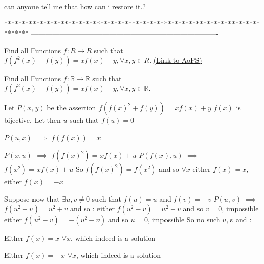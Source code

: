 \begin{solution}
	can anyone tell me that how can i restore it.?
\end{solution}
*******************************************************************************
-------------------------------------------------------------------------------

\begin{problem}
	Find all Functions $f:R \to R$ such that $f\left( {{f^2}\left( x \right) + f\left( y \right)} \right) = xf\left( x \right) + y,\forall x,y \in R.$
	\flushright \href{https://artofproblemsolving.com/community/c6h565030}{(Link to AoPS)}
\end{problem}



\begin{solution}
	\begin{tcolorbox}Find all Functions $f:\mathbb R \to \mathbb R$ such that $f\left( {{f^2}\left( x \right) + f\left( y \right)} \right) = xf\left( x \right) + y,\forall x,y \in \mathbb R.$\end{tcolorbox}
Let $P(x,y)$ be the assertion $f(f(x)^2+f(y))=xf(x)+y$
$f(x)$ is bijective.
Let then $u$ such that $f(u)=0$

$P(u,x)$ $\implies$ $f(f(x))=x$

$P(x,u)$ $\implies$ $f(f(x)^2)=xf(x)+u$
$P(f(x),u)$ $\implies$ $f(x^2)=xf(x)+u$
So $f(f(x)^2)=f(x^2)$ and so $\forall x$ either $f(x)=x$, either $f(x)=-x$

Suppose now that $\exists u,v\ne 0$ such that $f(u)=u$ and $f(v)=-v$
$P(u,v)$ $\implies$ $f(u^2-v)=u^2+v$ and so :
either $f(u^2-v)=u^2-v$ and so $v=0$, impossible
either $f(u^2-v)=-(u^2-v)$ and so $u=0$, impossible
So no such $u,v$ and :

Either $\boxed{f(x)=x}$ $\forall x$, which indeed is a solution

Either $\boxed{f(x)=-x}$ $\forall x$, which indeed is a solution
\end{solution}



